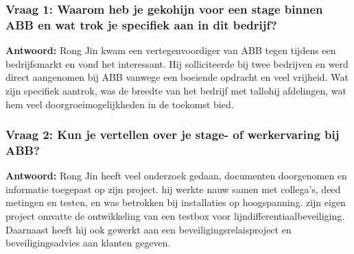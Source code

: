 \subsubsection*{Vraag 1: Waarom heb je gekohijn voor een stage binnen ABB en wat trok je specifiek aan in dit bedrijf?}

\textbf{Antwoord:} Rong Jin kwam een vertegenvoordiger van ABB tegen tijdens een bedrijfsmarkt en vond het interessant. Hij solliciteerde bij twee bedrijven en werd direct aangenomen bij ABB vanwege een boeiende opdracht en veel vrijheid. Wat zijn specifiek aantrok, was de breedte van het bedrijf met tallohij afdelingen, wat hem veel doorgroeimogelijkheden in de toekomst bied.

\subsubsection*{Vraag 2: Kun je vertellen over je stage- of werkervaring bij ABB?}

\textbf{Antwoord:} Rong Jin heeft veel onderzoek gedaan, documenten doorgenomen en informatie toegepast op zijn project. hij werkte nauw samen met collega's, deed metingen en testen, en was betrokken bij installaties op hoogspanning. zijn eigen project omvatte de ontwikkeling van een testbox voor lijndifferentiaalbeveiliging. Daarnaast heeft hij ook gewerkt aan een beveiligingsrelaisproject en beveiligingsadvies aan klanten gegeven.

